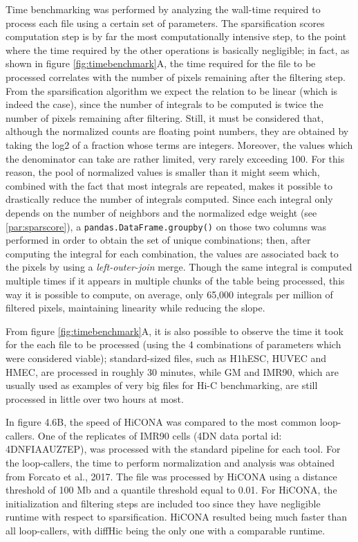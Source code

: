 Time benchmarking was performed by analyzing the wall-time required to process each file using a certain set of parameters. The sparsification scores computation step is by far the most computationally intensive step, to the point where the time required by the other operations is basically negligible; in fact, as shown in figure \ref{fig:timebenchmark}A, the time required for the file to be processed correlates with the number of pixels remaining after the filtering step. From the sparsification algorithm we expect the relation to be linear (which is indeed the case), since the number of integrals to be computed is twice the number of pixels remaining after filtering. Still, it must be considered that, although the normalized counts are floating point numbers, they are obtained by taking the log2 of a fraction whose terms are integers. Moreover, the values which the denominator can take are rather limited, very rarely exceeding 100. For this reason, the pool of normalized values is smaller than it might seem which, combined with the fact that most integrals are repeated, makes it possible to drastically reduce the number of integrals computed. Since each integral only depends on the number of neighbors and the normalized edge weight (see \ref{par:sparscore}), a \texttt{pandas.DataFrame.groupby()} on those two columns was performed in order to obtain the set of unique combinations; then, after computing the integral for each combination, the values are associated back to the pixels by using a \textit{left-outer-join} merge. Though the same integral is computed multiple times if it appears in multiple chunks of the table being processed, this way it is possible to compute, on average, only 65,000 integrals per million of filtered pixels, maintaining linearity while reducing the slope.

From figure \ref{fig:timebenchmark}A, it is also possible to observe the time it took for the each file to be processed (using the 4 combinations of parameters which were considered viable); standard-sized files, such as H1hESC, HUVEC and HMEC, are processed in roughly 30 minutes, while GM and IMR90, which are usually used as examples of very big files for Hi-C benchmarking, are still processed in little over two hours at most. 

In figure 4.6B, the speed of HiCONA was compared to the most common loop-callers. One of the replicates of IMR90 cells (4DN data portal id: 4DNFIAAUZ7EP), was processed with the standard pipeline for each tool. For the loop-callers, the time to perform normalization and analysis was obtained from Forcato et al., 2017\cite{toolcomparison2017}. The file was processed by HiCONA using a distance threshold of 100 Mb and a quantile threshold equal to 0.01. For HiCONA, the initialization and filtering steps are included too since they have negligible runtime with respect to sparsification. HiCONA resulted being much faster than all loop-callers, with diffHic being the only one with a comparable runtime.

